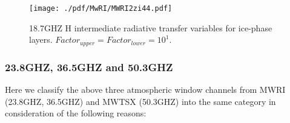 \begin{figure}[hbtp] 
\centering
\texttt{[image: ./pdf/MwRI/MWRI2zi44.pdf]}
\label{fig:MWRI2zi44}
\caption{18.7GHZ H intermediate radiative transfer variables for ice-phase layers. $Factor_{upper} = Factor_{lower} = 10^{1}$.}
\end{figure}

\clearpage


\subsubsection{23.8GHZ, 36.5GHZ and 50.3GHZ}

Here we classify the above three atmospheric window channels from MWRI (23.8GHZ, 36.5GHZ) and MWTSX (50.3GHZ) into the same category 
in consideration of the following reasons:

